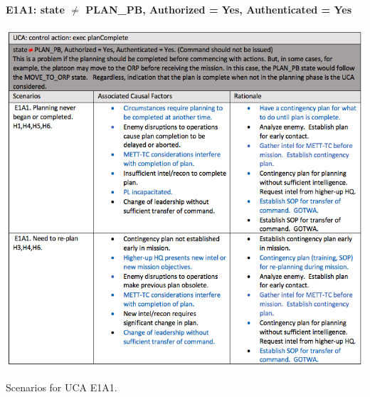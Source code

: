 \documentclass[../../main/main.tex]{subfiles}
\begin{document}
\paragraph*{E1A1: state  $\neq$ PLAN_PB, Authorized = Yes, Authenticated = Yes}

\begin{table}[ht!]
\begin{center}
\includegraphics[width=\linewidth]{../figures/ucaea1}
\caption{Scenarios for UCA E1A1.}
\label{ucaea1}
\end{center}
\end{table}
\clearpage
\end{document}
